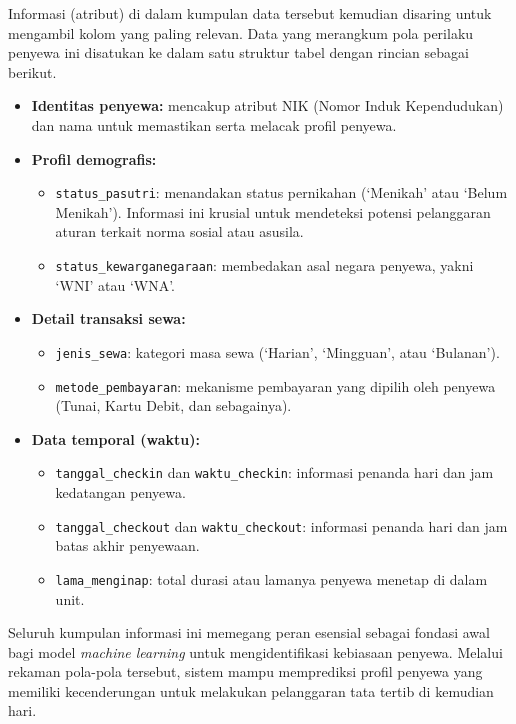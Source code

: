 Informasi (atribut) di dalam kumpulan data tersebut kemudian disaring untuk mengambil kolom yang paling relevan. Data yang merangkum pola perilaku penyewa ini disatukan ke dalam satu struktur tabel dengan rincian sebagai berikut.
\begin{itemize}
    \item \textbf{Identitas penyewa:} mencakup atribut NIK (Nomor Induk Kependudukan) dan nama untuk memastikan serta melacak profil penyewa.
    \item \textbf{Profil demografis:}
    \begin{itemize}
        \item \texttt{status\_pasutri}: menandakan status pernikahan (`Menikah' atau `Belum Menikah'). Informasi ini krusial untuk mendeteksi potensi pelanggaran aturan terkait norma sosial atau asusila.
        \item \texttt{status\_kewarganegaraan}: membedakan asal negara penyewa, yakni `WNI' atau `WNA'.
    \end{itemize}
    \item \textbf{Detail transaksi sewa:}
    \begin{itemize}
        \item \texttt{jenis\_sewa}: kategori masa sewa (`Harian', `Mingguan', atau `Bulanan').
        \item \texttt{metode\_pembayaran}: mekanisme pembayaran yang dipilih oleh penyewa (Tunai, Kartu Debit, dan sebagainya). 
    \end{itemize}
    \item \textbf{Data temporal (waktu):}
    \begin{itemize}
        \item \texttt{tanggal\_checkin} dan \texttt{waktu\_checkin}: informasi penanda hari dan jam kedatangan penyewa.
        \item \texttt{tanggal\_checkout} dan \texttt{waktu\_checkout}: informasi penanda hari dan jam batas akhir penyewaan.
        \item \texttt{lama\_menginap}: total durasi atau lamanya penyewa menetap di dalam unit.
    \end{itemize}
\end{itemize}

Seluruh kumpulan informasi ini memegang peran esensial sebagai fondasi awal bagi model \textit{machine learning} untuk mengidentifikasi kebiasaan penyewa. Melalui rekaman pola-pola tersebut, sistem mampu memprediksi profil penyewa yang memiliki kecenderungan untuk melakukan pelanggaran tata tertib di kemudian hari.
